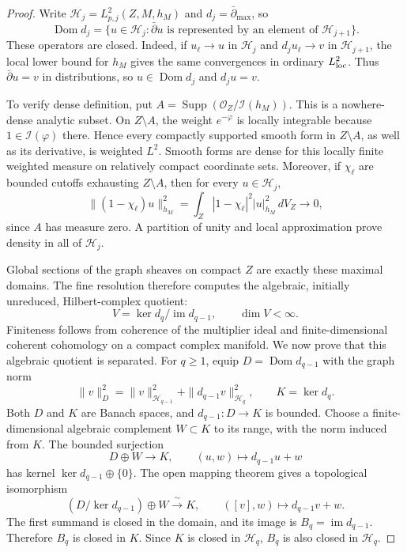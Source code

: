 \documentclass[11pt,reqno]{amsart}
\numberwithin{equation}{section}
\theoremstyle{definition}
\theoremstyle{remark}
\begin{document}
\begin{proof}
Write $\mathcal H_j=L^2_{p,j}(Z,M,h_M)$ and
$d_j=\bar\partial_{\max}$, so
\[
 \operatorname{Dom}d_j
  =\{u\in\mathcal H_j:\bar\partial u
           \text{ is represented by an element of }\mathcal H_{j+1}\}.
\]
These operators are closed.  Indeed, if
$u_\ell\to u$ in $\mathcal H_j$ and
$d_ju_\ell\to v$ in $\mathcal H_{j+1}$, the local lower bound for
$h_M$ gives the same convergences in ordinary $L^2_{\rm loc}$.
Thus $\bar\partial u=v$ in distributions, so
$u\in\operatorname{Dom}d_j$ and $d_ju=v$.

To verify dense definition, put
$A=\operatorname{Supp}(\mathcal O_Z/\mathcal I(h_M))$.
This is a nowhere-dense analytic subset.  On $Z\setminus A$, the weight
$e^{-\varphi}$ is locally integrable because
$1\in\mathcal I(\varphi)$ there.  Hence every compactly supported
smooth form in $Z\setminus A$, as well as its derivative, is
weighted $L^2$.  Smooth forms are dense for this locally finite
weighted measure on relatively compact coordinate sets.
Moreover, if $\chi_\ell$ are bounded cutoffs exhausting
$Z\setminus A$, then for every $u\in\mathcal H_j$,
\[
 \|(1-\chi_\ell)u\|_{h_M}^2
   =\int_Z|1-\chi_\ell|^2|u|_{h_M}^2\,dV_Z\longrightarrow0,
\]
since $A$ has measure zero.  A partition of unity and local
approximation prove density in all of $\mathcal H_j$.

Global sections of the graph sheaves on compact $Z$ are exactly
these maximal domains.  The fine resolution therefore computes
the algebraic, initially unreduced, Hilbert-complex quotient:
\[
 V=\ker d_q/\operatorname{im}d_{q-1},\qquad \dim V<\infty.
\]
Finiteness follows from coherence of the multiplier ideal and
finite-dimensional coherent cohomology on a compact complex
manifold.  We now prove that this algebraic quotient is separated.
For $q\ge1$, equip
$D=\operatorname{Dom}d_{q-1}$ with the graph norm
\[
 \|v\|_D^2=\|v\|_{\mathcal H_{q-1}}^2
                         +\|d_{q-1}v\|_{\mathcal H_q}^2,
 \qquad K=\ker d_q.
\]
Both $D$ and $K$ are Banach spaces, and
$d_{q-1}:D\to K$ is bounded.  Choose a finite-dimensional algebraic
complement $W\subset K$ to its range, with the norm induced from
$K$.  The bounded surjection
\[
 D\oplus W\longrightarrow K,\qquad (u,w)\longmapsto d_{q-1}u+w
\]
has kernel $\ker d_{q-1}\oplus\{0\}$.  The open mapping theorem gives
a topological isomorphism
\[
 (D/\ker d_{q-1})\oplus W\xrightarrow{\ \sim\ }K,\qquad
 ([v],w)\longmapsto d_{q-1}v+w.
\]
The first summand is closed in the domain, and its image is
$B_q=\operatorname{im}d_{q-1}$.  Therefore $B_q$ is closed in $K$.
Since $K$ is closed in $\mathcal H_q$, $B_q$ is also closed in
$\mathcal H_q$.


\end{proof}
\end{document}
